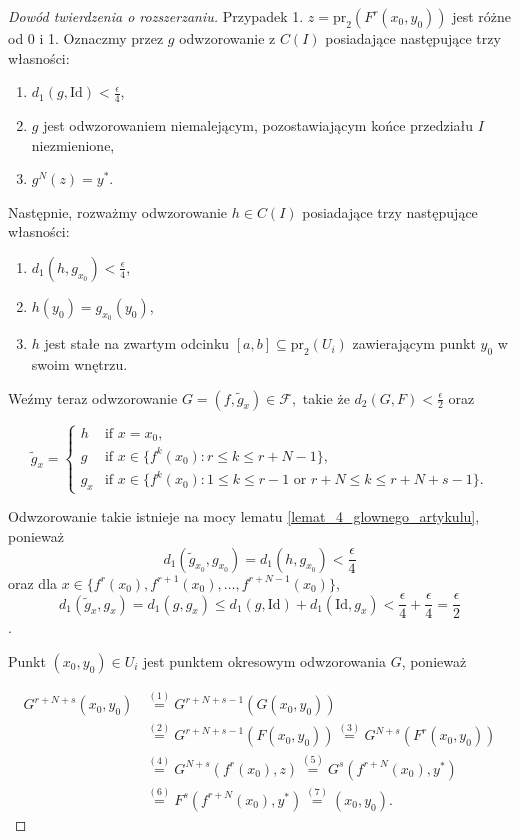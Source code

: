 \documentclass[licencjacka]{pwr_wmat_praca_dyplomowa}
\theoremstyle{plain}
\numberwithin{theorem}{chapter}
\theoremstyle{definition}
\numberwithin{theorem}{chapter}
\begin{document}
\begin{proof}[Dowód twierdzenia o rozszerzaniu]
Przypadek 1. $z = \textrm{pr}_2(F^r(x_0, y_0))$ jest różne od 0 i 1.
Oznaczmy przez $g$ odwzorowanie z $C(I)$ posiadające następujące trzy własności:
\begin{enumerate}[label=(g\arabic*)]
\item \label{g_jeden} $d_1(g, \mathrm{Id}) < \frac{\epsilon}{4}$,
\item \label{g_dwa} $g$ jest odwzorowaniem niemalejącym, pozostawiającym końce przedziału $I$ niezmienione,
\item \label{g_trzy} $g^N(z) = y^*$.
\end{enumerate}

Następnie, rozważmy odwzorowanie $h \in C(I)$ posiadające trzy następujące własności:
\begin{enumerate}[label=(h\arabic*)]
\item \label{h_jeden} $d_1(h, g_{x_0}) < \frac{\epsilon}{4}$,
\item \label{h_dwa} $h(y_0) = g_{x_0}(y_0)$,
\item \label{h_trzy} $h$ jest stałe na zwartym odcinku $[a,b] \subseteq \textrm{pr}_2(U_i)$ zawierającym punkt $y_0$ w swoim wnętrzu.
\end{enumerate}

Weźmy teraz odwzorowanie $G = (f, \widetilde{g}_x) \in \mathcal{F},$ takie że $d_2(G, F) < \frac{\epsilon}{2}$ oraz

\begin{equation}
\label{rownanie_g_z_falka}
    \widetilde{g}_x =
    \begin{cases}
        h & \text{if $x=x_0$,}\\
        g & \text{if $x \in \{f^k(x_0) : r \leq k \leq r+N-1\}$,}\\
        g_x & \text{if $x \in \{f^k(x_0) : 1 \leq k \leq r-1$ or $r+N \leq k \leq r+N+s-1\}$.}
    \end{cases}
\end{equation}

Odwzorowanie takie istnieje na mocy lematu \ref{lemat_4_glownego_artykulu}, ponieważ
$$d_1(\widetilde{g}_{x_0}, g_{x_0}) = d_1(h, g_{x_0}) < \frac{\epsilon}{4}$$
oraz dla $x \in \{f^r(x_0), f^{r+1}(x_0), \ldots, f^{r+N-1}(x_0)\}$,
$$d_1(\widetilde{g}_x, g_x) = d_1(g, g_x) \leq d_1(g, \mathrm{Id}) + d_1(\mathrm{Id}, g_x) < \frac{\epsilon}{4} + \frac{\epsilon}{4} = \frac{\epsilon}{2}$$.

Punkt $(x_0, y_0) \in U_i$ jest punktem okresowym odwzorowania $G$, ponieważ

\begin{equation}
\begin{split}
G^{r+N+s}(x_0, y_0) & \stackrel{(1)}{=} G^{r+N+s-1}(G(x_0, y_0)) \\
& \stackrel{(2)}{=} G^{r+N+s-1}(F(x_0, y_0)) \stackrel{(3)}{=} G^{N+s}(F^r(x_0, y_0)) \\
& \stackrel{(4)}{=} G^{N+s}(f^r(x_0), z) \stackrel{(5)}{=} G^s(f^{r+N}(x_0), y^*) \\
& \stackrel{(6)}{=} F^s(f^{r+N}(x_0), y^*) \stackrel{(7)}{=} (x_0, y_0).
\end{split}
\end{equation}


\end{proof}
\end{document}

